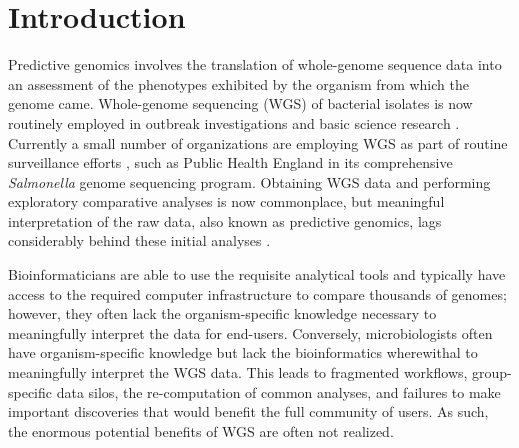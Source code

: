 \documentclass{bmcart}
\begin{document}


\section*{Introduction}
Predictive genomics involves the translation of whole-genome sequence data into an assessment of the phenotypes exhibited by the organism from which the genome came. Whole-genome sequencing (WGS) of bacterial isolates is now routinely employed in outbreak investigations and basic science research \cite{reuter_pilot_2013,fittipaldi_integrated_2013}. Currently a small number of organizations are employing WGS as part of routine surveillance efforts \cite{zankari_genotyping_2013,cody_real-time_2013}, such as Public Health England in its comprehensive \textit{Salmonella} genome sequencing program. Obtaining WGS data and performing exploratory comparative analyses is now commonplace, but meaningful interpretation of the raw data, also known as predictive genomics, lags considerably behind these initial analyses \cite{sherry_outbreak_2013}.

Bioinformaticians are able to use the requisite analytical tools and typically have access to the required computer infrastructure to compare thousands of genomes; however, they often lack the organism-specific knowledge necessary to meaningfully interpret the data for end-users. Conversely, microbiologists often have organism-specific knowledge but lack the bioinformatics wherewithal to meaningfully interpret the WGS data. This leads to fragmented workflows, group-specific data silos, the re-computation of common analyses, and failures to make important discoveries that would benefit the full community of users. As such, the enormous potential benefits of WGS are often not realized.
\end{document}
